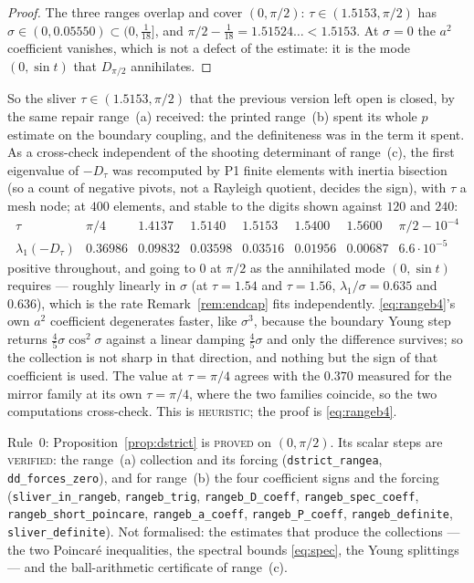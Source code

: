 \documentclass[11pt]{article}
\theoremstyle{definition}
\begin{document}
\begin{proof}
The three ranges overlap and cover $(0,\pi/2)$: $\tau\in(1.5153,\pi/2)$ has
$\sigma\in(0,0.05550)\subset(0,\tfrac1{18}]$, and $\pi/2-\tfrac1{18}=1.51524\ldots<1.5153$.
At $\sigma=0$ the $a^2$ coefficient vanishes, which is not a defect of the estimate: it is
the mode $(0,\sin t)$ that $D_{\pi/2}$ annihilates.
\end{proof}

So the sliver $\tau\in(1.5153,\pi/2)$ that the previous version left open is closed, by the
same repair range~(a) received: the printed range~(b) spent its whole $p$ estimate on the
boundary coupling, and the definiteness was in the term it spent. As a cross-check
independent of the shooting determinant of range~(c), the first eigenvalue of $-D_\tau$ was
recomputed by P1 finite elements with inertia bisection (so a count of negative pivots, not a
Rayleigh quotient, decides the sign), with $\tau$ a mesh node; at $400$ elements, and stable
to the digits shown against $120$ and $240$:
\[
  \begin{array}{r|ccccccc}
    \tau & \pi/4 & 1.4137 & 1.5140 & 1.5153 & 1.5400 & 1.5600 & \pi/2-10^{-4}\\\hline
    \lambda_1(-D_\tau) & 0.36986 & 0.09832 & 0.03598 & 0.03516 & 0.01956 & 0.00687
      & 6.6\cdot10^{-5}
  \end{array}
\]
positive throughout, and going to $0$ at $\pi/2$ as the annihilated mode $(0,\sin t)$
requires --- roughly linearly in $\sigma$ (at $\tau=1.54$ and $\tau=1.56$,
$\lambda_1/\sigma=0.635$ and $0.636$), which is the rate Remark~\ref{rem:endcap} fits
independently. \eqref{eq:rangeb4}'s own $a^2$ coefficient degenerates faster, like
$\sigma^3$, because the boundary Young step returns $\tfrac45\sigma\cos^2\sigma$ against a
linear damping $\tfrac45\sigma$ and only the difference survives; so the collection is not
sharp in that direction, and nothing but the sign of that coefficient is used. The value
at $\tau=\pi/4$ agrees with the $0.370$ measured for the mirror family at its own
$\tau=\pi/4$, where the two families coincide, so the two computations cross-check. This is
\textsc{heuristic}; the proof is \eqref{eq:rangeb4}.

Rule~0: Proposition~\ref{prop:dstrict} is \textsc{proved} on $(0,\pi/2)$. Its scalar steps
are \textsc{verified}: the range~(a) collection and its forcing (\verb|dstrict_rangea|,
\verb|dd_forces_zero|), and for range~(b) the four coefficient signs and the forcing
(\verb|sliver_in_rangeb|, \verb|rangeb_trig|, \verb|rangeb_D_coeff|,
\verb|rangeb_spec_coeff|, \verb|rangeb_short_poincare|, \verb|rangeb_a_coeff|,
\verb|rangeb_P_coeff|, \verb|rangeb_definite|, \verb|sliver_definite|). Not formalised: the
estimates that produce the collections --- the two Poincar\'e inequalities, the spectral
bounds \eqref{eq:spec}, the Young splittings --- and the ball-arithmetic certificate of
range~(c).
\end{document}
